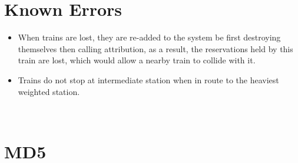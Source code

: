 \documentclass[12pt]{article}
\begin{document}
\section{Known Errors}
\begin{itemize}
  \item When trains are lost, they are re-added to the system be first destroying themselves then calling attribution, as a result, the reservations held by this train are lost, which would allow a nearby train to collide with it.
  \item Trains do not stop at intermediate station when in route to the heaviest weighted station.
\end{itemize}
\\[2\baselineskip]
\section{MD5}

\end{document}
